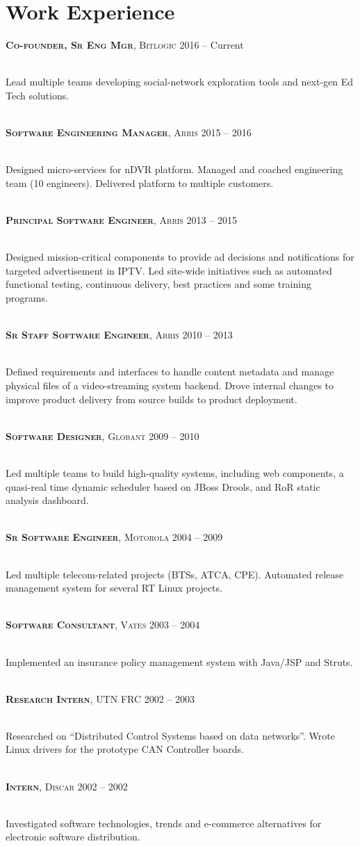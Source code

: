 \documentclass[10pt]{article}
\newcommand \jobdesc[4] {%
	{{\raggedright \large \textbf{\textsc{#1}}, \normalsize\textsc{#2} \hfill \normalsize{\textsc #3 -- #4}}}
}
\begin{document}
\begin{minipage}[t]{0.5\textwidth}
\section{Work Experience} 
\jobdesc{Co-founder, Sr Eng Mgr}{Bitlogic}{2016}{Current}\\
\normalsize{Lead multiple teams developing social-network exploration tools and next-gen Ed Tech solutions.}\\
\\
\jobdesc{Software Engineering Manager}{Arris}{2015}{2016}\\
\normalsize{Designed micro-services for nDVR platform. Managed and coached engineering team (10 engineers). Delivered platform to multiple customers.}\\
\\
\jobdesc{Principal Software Engineer}{Arris}{2013}{2015}\\
\normalsize{Designed mission-critical components to provide ad decisions and notifications for targeted advertisement in IPTV. Led site-wide initiatives such as automated functional testing, continuous delivery, best practices and some training programs.}\\
\\
\jobdesc{Sr Staff Software Engineer}{Arris}{2010}{2013}\\
\normalsize{Defined requirements and interfaces to handle content metadata and manage physical files of a video-streaming system backend. Drove internal changes to improve product delivery from source builds to product deployment.}\\
\\
\jobdesc{Software Designer}{Globant}{2009}{2010}\\
\normalsize{Led multiple teams to build high-quality systems, including web components, a quasi-real time dynamic scheduler based on JBoss Drools, and RoR static analysis dashboard.}\\
\\
\jobdesc{Sr Software Engineer}{Motorola}{2004}{2009}\\
\normalsize{Led multiple telecom-related projects (BTSs, ATCA, CPE). Automated release management system for several RT Linux projects.}\\
\\
\jobdesc{Software Consultant}{Vates}{2003}{2004}\\
\normalsize{Implemented an insurance policy management system with Java/JSP and Struts.}\\
\\
\jobdesc{Research Intern}{UTN FRC}{2002}{2003}\\
\normalsize{Researched on “Distributed Control Systems based on data networks”. Wrote Linux drivers for the prototype CAN Controller boards.}\\
\\
\jobdesc{Intern}{Discar}{2002}{2002}\\
\normalsize{Investigated software technologies, trends and e-commerce alternatives for electronic software distribution.}


\end{minipage}
\end{document}

